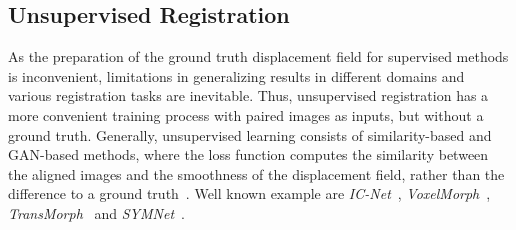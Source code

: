 \documentclass[english,version-2022-01]{uzl-thesis} %
\begin{document}
\subsection{Unsupervised Registration} \label{SubSec:UnsupervisedRegistration}
As the preparation of the ground truth displacement field for supervised methods is inconvenient, limitations in generalizing results in different domains and various registration tasks are inevitable. Thus, unsupervised registration has a more convenient training process with paired images as inputs, but without a ground truth. Generally, unsupervised learning consists of similarity-based and GAN-based methods, where the loss function computes the similarity between the aligned images and the smoothness of the displacement field, rather than the difference to a ground truth~\cite{Zou2022}. Well known example are \emph{IC-Net}~\cite{IC-Net},  \emph{VoxelMorph}~\cite{Voxelmorph}, \emph{TransMorph}~\cite{TransMorph} and \emph{SYMNet}~\cite{SYM-Net}.
\end{document}
